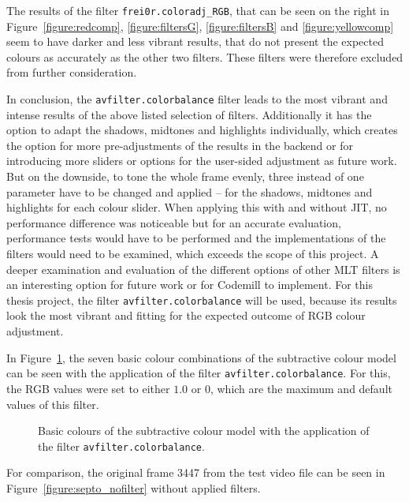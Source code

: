 \documentclass[../MasterThesis.tex]{subfiles}
\begin{document}
The results of the filter \texttt{frei0r.coloradj\_RGB}, that can be seen on the right in Figure~\ref{figure:redcomp}, \ref{figure:filtersG}, \ref{figure:filtersB} and \ref{figure:yellowcomp} seem to have darker and less vibrant results, that do not present the expected colours as accurately as the other two filters. These filters were therefore excluded from further consideration.


In conclusion, the \texttt{avfilter.colorbalance} filter leads to the most vibrant and intense results of the above listed selection of filters. Additionally it has the option to adapt the shadows, midtones and highlights individually, which creates the option for more pre-adjustments of the results in the backend or for introducing more sliders or options for the user-sided adjustment as future work.
But on the downside, to tone the whole frame evenly, three instead of one parameter have to be changed and applied -- for the shadows, midtones and highlights for each colour slider.
When applying this with and without JIT, no performance difference was noticeable but for an accurate evaluation, performance tests would have to be performed and the implementations of the filters would need to be examined, which exceeds the scope of this project.
%
A deeper examination and evaluation of the different options of other MLT filters is an interesting option for future work or for Codemill to implement. For this thesis project, the filter \texttt{avfilter.colorbalance} will be used, because its results look the most vibrant and fitting for the expected outcome of RGB colour adjustment.

In Figure~\ref{figure:septopus}, the seven basic colour combinations of the subtractive colour model can be seen with the application of the filter \texttt{avfilter.colorbalance}. For this, the RGB values were set to either $1.0$ or $0$, which are the maximum and default values of this filter. 



\begin{figure}[H]
	\begin{center}
		\caption[Basic colours with the application of the filter \texttt{avfilter.colorbalance}.]{Basic colours of the subtractive colour model with the application of the filter \texttt{avfilter.colorbalance}.}
		\label{figure:septopus}
	\end{center}
\end{figure}

For comparison, the original frame 3447 from the test video file can be seen in Figure~\ref{figure:septo_nofilter} without applied filters.
\end{document}

